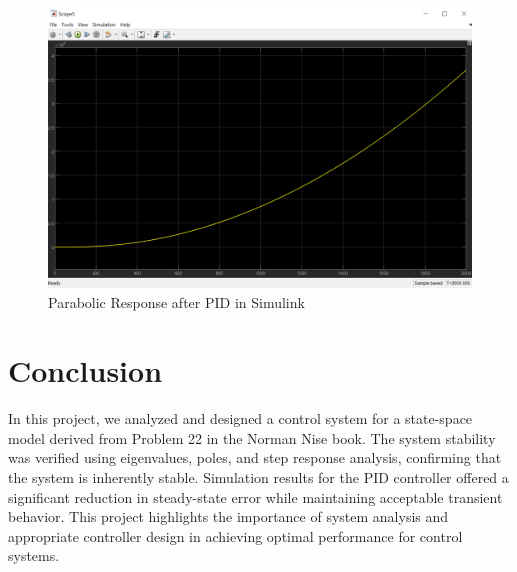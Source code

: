 \documentclass{article}
\begin{document}

\begin{figure}[h!]
	\centering
	\includegraphics[scale=0.45]{images/parabolicResponse_PID_Simulink.png}
	\caption{Parabolic Response after PID in Simulink}
	\label{fig:parabolicResponse_PID_Simulink}
\end{figure}


\vskip400pt
\section{Conclusion}
In this project, we analyzed and designed a control system for a state-space model derived from Problem 22 in the Norman Nise book. The system stability was verified using eigenvalues, poles, and step response analysis, confirming that the system is inherently stable. Simulation results for the PID controller offered a significant reduction in steady-state error while maintaining acceptable transient behavior. 
This project highlights the importance of system analysis and appropriate controller design in achieving optimal performance for control systems.
  
\end{document}
